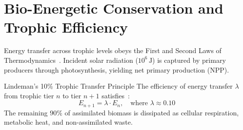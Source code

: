 \documentclass[12pt, a4paper]{article}
\begin{document}
\vspace{0.6cm}
\tableofcontents
\newpage
{}

\section{Bio-Energetic Conservation and Trophic Efficiency}
Energy transfer across trophic levels obeys the First and Second Laws of Thermodynamics~\cite{lindeman1942trophic, begon2006ecology}. Incident solar radiation ($10^6\,\mathrm{J}$) is captured by primary producers through photosynthesis, yielding net primary production (NPP).

\begin{theorybox}{Lindeman's 10\% Trophic Transfer Principle}
    The efficiency of energy transfer $\lambda$ from trophic tier $n$ to tier $n+1$ satisfies~\cite{lindeman1942trophic, keener2009mathematical}:
    \begin{equation}
        E_{n+1} = \lambda \cdot E_n, \quad \text{where } \lambda \approx 0.10
    \end{equation}
    The remaining $90\%$ of assimilated biomass is dissipated as cellular respiration, metabolic heat, and non-assimilated waste.
\end{theorybox}
\end{document}
